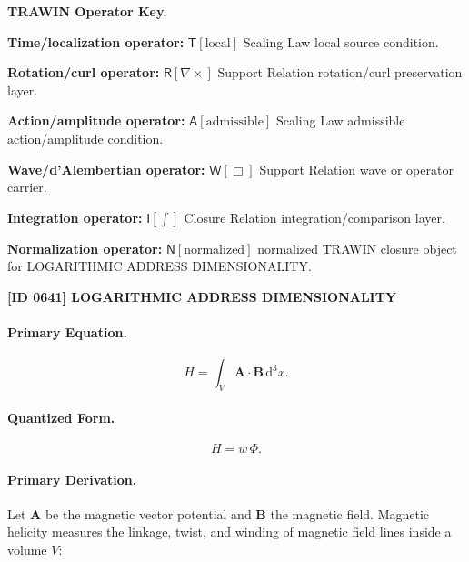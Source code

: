 \par\vspace{0.45\baselineskip}
\noindent\begin{minipage}[t]{\linewidth}
\begingroup
\small
\raggedright
\textbf{TRAWIN Operator Key.}\par
\noindent\textbf{Time/localization operator:} $\mathsf{T}\!\left[\mathrm{local}\right]$ Scaling Law local source condition.\par
\noindent\textbf{Rotation/curl operator:} $\mathsf{R}\!\left[\nabla\times\right]$ Support Relation rotation/curl preservation layer.\par
\noindent\textbf{Action/amplitude operator:} $\mathsf{A}\!\left[\mathrm{admissible}\right]$ Scaling Law admissible action/amplitude condition.\par
\noindent\textbf{Wave/d'Alembertian operator:} $\mathsf{W}\!\left[\Box\right]$ Support Relation wave or operator carrier.\par
\noindent\textbf{Integration operator:} $\mathsf{I}\!\left[\int\right]$ Closure Relation integration/comparison layer.\par
\noindent\textbf{Normalization operator:} $\mathsf{N}\!\left[\mathrm{normalized}\right]$ normalized TRAWIN closure object for LOGARITHMIC ADDRESS DIMENSIONALITY.\par
\endgroup
\end{minipage}

\clearpage
\noindent\textbf{[ID 0641] LOGARITHMIC ADDRESS DIMENSIONALITY}\par
\vspace{0.35em}
\paragraph{Primary Equation.}
\begin{equation}
H
=
\int_V
\mathbf{A}\cdot\mathbf{B}
\,\mathrm{d}^3x .
\end{equation}

\paragraph{Quantized Form.}
\begin{equation}
H=w\,\Phi .
\end{equation}

\paragraph{Primary Derivation.}
Let $\mathbf{A}$ be the magnetic vector potential and $\mathbf{B}$ the magnetic field.  
Magnetic helicity measures the linkage, twist, and winding of magnetic field lines inside a volume $V$:

